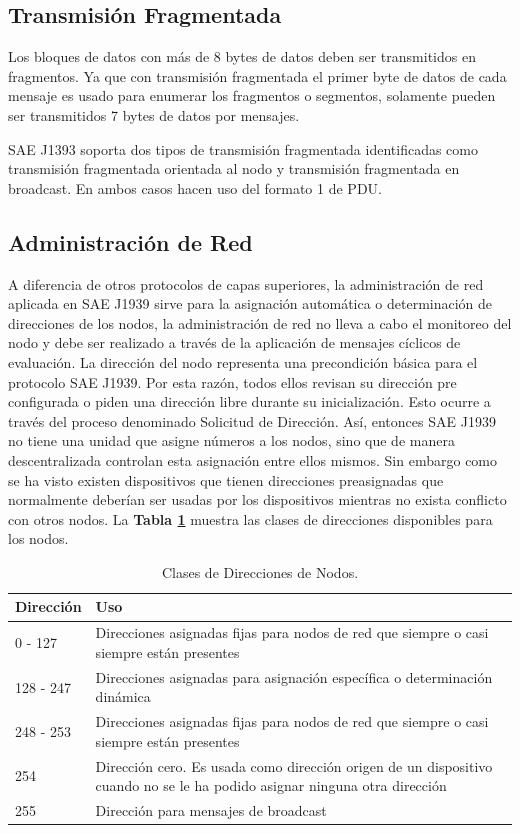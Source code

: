 \subsection{Transmisión Fragmentada} 
Los bloques de datos con más de 8 bytes de datos deben ser transmitidos en fragmentos. Ya que con transmisión fragmentada el primer byte de datos de cada mensaje es usado para enumerar los fragmentos o segmentos, solamente pueden ser transmitidos 7 bytes de datos por mensajes.

SAE J1393 soporta dos tipos de transmisión fragmentada identificadas como transmisión fragmentada orientada al nodo y transmisión fragmentada en broadcast. En ambos casos hacen uso del formato 1 de PDU.

\subsection{Administración de Red}
A diferencia de otros protocolos de capas superiores, la administración de red aplicada en SAE J1939 sirve para la asignación automática o determinación de direcciones de los nodos, la administración de red no lleva a cabo el monitoreo del nodo y debe ser realizado a través de la aplicación de mensajes cíclicos de evaluación.
La dirección del nodo representa una precondición básica para el protocolo SAE J1939. Por esta razón, todos ellos revisan su dirección pre configurada o piden una dirección libre durante su inicialización.  Esto ocurre a través del proceso denominado Solicitud de Dirección. Así, entonces SAE J1939 no tiene una unidad que asigne números a los nodos, sino que de manera descentralizada controlan esta asignación entre ellos mismos.
Sin embargo como se ha visto existen dispositivos que tienen direcciones preasignadas que normalmente deberían ser usadas por los dispositivos mientras no exista conflicto con otros nodos. La \textbf{Tabla \ref{nodos}} muestra las clases de direcciones disponibles para los nodos. 


\begin{table}[htb]
\begin{center}
\begin{tabular} {p{2cm} p{9cm}}%
\hline
Dirección & Uso  \\
\hline \hline
0 - 127 & Direcciones asignadas fijas para nodos de red que siempre o casi siempre están presentes \\ \hline
128 - 247 & Direcciones asignadas para asignación específica o determinación dinámica \\ \hline
248 - 253 & Direcciones asignadas fijas para nodos de red que siempre o casi siempre están presentes \\ \hline
254 & Dirección cero. Es usada como dirección origen de un dispositivo cuando no se le ha podido asignar ninguna otra dirección \\ \hline
255 & Dirección para mensajes de broadcast \\ \hline
\end{tabular}
\caption{Clases de Direcciones de Nodos.}
\label{nodos}
\end{center}
\end{table}

